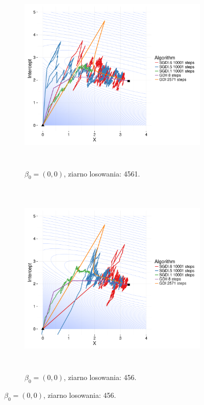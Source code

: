 \begin{figure}[hbt!]
  \begin{center}
   \begin{subfigure}[h!]{0.99\textwidth}
      \includegraphics[width=\textwidth, height=270pt]{Obrazki/Numeryka/sgd_00_1.pdf}
      \caption{$\beta_0 = (0,0)$, ziarno losowania: 4561.}
   \end{subfigure}     
   \begin{subfigure}[h!]{0.99\textwidth}
      \includegraphics[width=\textwidth, height=270pt]{Obrazki/Numeryka/sgd_00_2.pdf}
      \caption{$\beta_0 = (0,0)$, ziarno losowania: 456.}
   \end{subfigure}  \end{center}

\end{figure}
